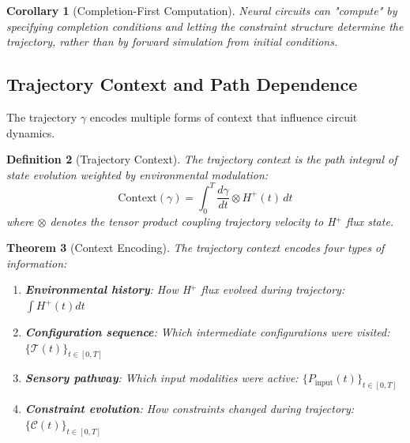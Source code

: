 \documentclass[aps,prd,twocolumn,superscriptaddress,floatfix,nofootinbib]{revtex4-2}
\newtheorem{theorem}{Theorem}[section]
\newtheorem{definition}[theorem]{Definition}
\newtheorem{corollary}[theorem]{Corollary}
\theoremstyle{remark}
\begin{document}
\begin{corollary}[Completion-First Computation]
\label{cor:completion_first}
Neural circuits can "compute" by specifying completion conditions and letting the constraint structure determine the trajectory, rather than by forward simulation from initial conditions.
\end{corollary}

\subsection{Trajectory Context and Path Dependence}

The trajectory $\gamma$ encodes multiple forms of context that influence circuit dynamics.

\begin{definition}[Trajectory Context]
\label{def:trajectory_context}
The trajectory context is the path integral of state evolution weighted by environmental modulation:
\begin{equation}
\text{Context}(\gamma) = \int_0^T \frac{d\gamma}{dt} \otimes H^+(t) \, dt
\end{equation}
where $\otimes$ denotes the tensor product coupling trajectory velocity to H$^+$ flux state.
\end{definition}

\begin{theorem}[Context Encoding]
\label{thm:context_encoding}
The trajectory context encodes four types of information:
\begin{enumerate}
\item \textbf{Environmental history}: How H$^+$ flux evolved during trajectory: $\int H^+(t) dt$
\item \textbf{Configuration sequence}: Which intermediate configurations were visited: $\{\mathcal{T}(t)\}_{t \in [0,T]}$
\item \textbf{Sensory pathway}: Which input modalities were active: $\{P_{\text{input}}(t)\}_{t \in [0,T]}$
\item \textbf{Constraint evolution}: How constraints changed during trajectory: $\{\mathcal{C}(t)\}_{t \in [0,T]}$
\end{enumerate}
\end{theorem}
\end{document}
